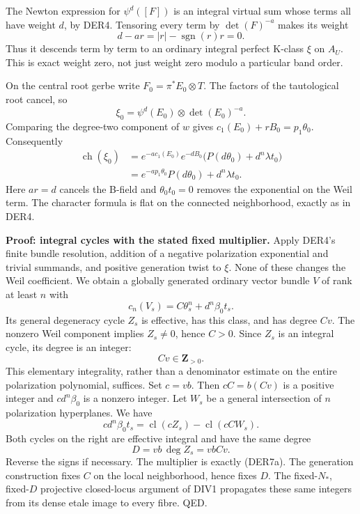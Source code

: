 \documentclass[11pt,a4paper]{article}
\theoremstyle{definition}
\begin{document}
The Newton expression for \(\psi^d([F])\) is an integral virtual sum
whose terms all have weight \(d\), by DER4. Tensoring every term by
\(\det(F)^{-a}\) makes its weight \[
 d-ar=|r|-\operatorname{sgn}(r)r=0.
\] Thus it descends term by term to an ordinary integral perfect K-class
\(\xi\) on \(A_U\). This is exact weight zero, not just weight zero
modulo a particular band order.

On the central root gerbe write \(F_0=\pi^*E_0\otimes T\). The factors
of the tautological root cancel, so \[
 \xi_0=\psi^d(E_0)\otimes\det(E_0)^{-a}.
\] Comparing the degree-two component of \(w\) gives
\(c_1(E_0)+rB_0=p_1\theta_0\). Consequently \[
 \begin{aligned}
 \operatorname{ch}(\xi_0)
 &=e^{-a c_1(E_0)}e^{-dB_0}
       \bigl(P(d\theta_0)+d^n\lambda t_0\bigr)\\
 &=e^{-a p_1\theta_0}P(d\theta_0)+d^n\lambda t_0.
 \end{aligned}
\tag{DER7b}
\] Here \(ar=d\) cancels the B-field and \(\theta_0t_0=0\) removes the
exponential on the Weil term. The character formula is flat on the
connected neighborhood, exactly as in DER4.

\textbf{Proof: integral cycles with the stated fixed multiplier.} Apply
DER4's finite bundle resolution, addition of a negative polarization
exponential and trivial summands, and positive generation twist to
\(\xi\). None of these changes the Weil coefficient. We obtain a
globally generated ordinary vector bundle \(V\) of rank at least \(n\)
with \[
 c_n(V_s)=C\theta_s^n+d^n\beta_0t_s.
\] Its general degeneracy cycle \(Z_s\) is effective, has this class,
and has degree \(Cv\). The nonzero Weil component implies \(Z_s\ne0\),
hence \(C>0\). Since \(Z_s\) is an integral cycle, its degree is an
integer: \[
 Cv\in\mathbf Z_{>0}.
\tag{DER7c}
\] This elementary integrality, rather than a denominator estimate on
the entire polarization polynomial, suffices. Set \(c=vb\). Then
\(cC=b(Cv)\) is a positive integer and \(c d^n\beta_0\) is a nonzero
integer. Let \(W_s\) be a general intersection of \(n\) polarization
hyperplanes. We have \[
 c d^n\beta_0t_s
   =\operatorname{cl}(cZ_s)-\operatorname{cl}(cC W_s).
\] Both cycles on the right are effective integral and have the same
degree \[
 D=vb\,\deg Z_s=vbCv.
\tag{DER7d}
\] Reverse the signs if necessary. The multiplier is exactly (DER7a).
The generation construction fixes \(C\) on the local neighborhood, hence
fixes \(D\). The fixed-\(N_*\), fixed-\(D\) projective closed-locus
argument of DIV1 propagates these same integers from its dense etale
image to every fibre. QED.
\end{document}
